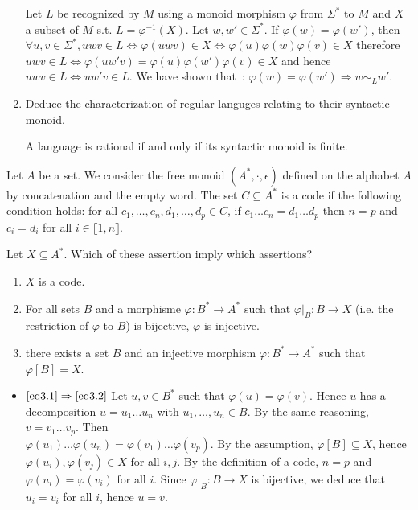 \documentclass[a4paper,11pt]{exam}
\begin{document}
\begin{questions}
\begin{enumerate}
\begin{solution}
        Let $L$ be recognized by $M$ using a monoid morphism $\varphi$
        from $\Sigma^*$ to $M$ and $X$ a subset of $M$ s.t. $L = \varphi^{-1}(X)$.
        Let $w,w' \in \Sigma^*$.
        If $\varphi(w)=\varphi(w')$, then
        $\forall u,v \in \Sigma^*, uwv \in L \iff
        \varphi(uwv) \in X \iff \varphi(u)\varphi(w)\varphi(v) \in X$ therefore
        $uwv \in L \iff \varphi(uw'v)=\varphi(u)\varphi(w')\varphi(v) \in X$
        and hence $uwv \in L \iff uw'v \in L$.
        We have shown that~: $\varphi(w) = \varphi(w') \Rightarrow w \sim_L w'$.
      \end{solution}
      
    \item Deduce the characterization of regular languges relating to their syntactic monoid.

      \begin{solution}
        A language is rational if and only if its syntactic monoid is finite.
      \end{solution}
  \end{enumerate}

\question
Let $A$ be a set. We consider the free monoid $(A^*,\cdot,\epsilon)$ defined on the alphabet $A$ by concatenation and the empty word. The set $C \subseteq A^*$ is a code if the following condition holds:  for all $c_1,\dots,c_n, d_1,\dots, d_p \in C$, if $c_1 \dots c_n = d_1 \dots d_p$ then $n = p$ and $c_i = d_ i$ for all $i \in \llbracket 1,n \rrbracket$.

Let $X \subseteq A^*$. Which of these assertion imply which assertions?
\begin{enumerate}
	\item\label{eq3.1} $X$ is a code.
	\item\label{eq3.2} For all sets $B$ and a morphisme $\varphi : B^* \to A^*$ such that $\varphi|_B : B \to X$ (i.e. the restriction of $\varphi$ to $B$) is bijective, $\varphi$ is injective.
	\item\label{eq3.3} there exists a set $B$ and an injective morphism $\varphi : B^* \to A^*$ such that $\varphi[B] = X$.
\end{enumerate}

\begin{solution}
	\begin{itemize}
		\item $\ref{eq3.1} \Rightarrow \ref{eq3.2}$ Let $u,v \in B^*$ such that $\varphi(u) = \varphi(v)$. Hence $u$ has a decomposition $u = u_1\dots u_n$ with $u_1,\dots ,u_n \in B$. By the same reasoning, $v = v_1\dots v_p$. Then \\ $\varphi(u_1) \dots \varphi(u_n) = \varphi(v_1) \dots \varphi(v_p)$. By the assumption, $\varphi[B] \subseteq X$, hence $\varphi(u_i), \varphi(v_j) \in X$ for all $i,j$. By the definition of a code, $n = p$ and $\varphi(u_i) = \varphi(v_i)$ for all $i$. Since $\varphi|_B : B \to X$ is bijective, we deduce that $u_i = v_i$ for all $i$, hence $u = v$.
		

\end{itemize}
\end{solution}
\end{questions}
\end{document}
